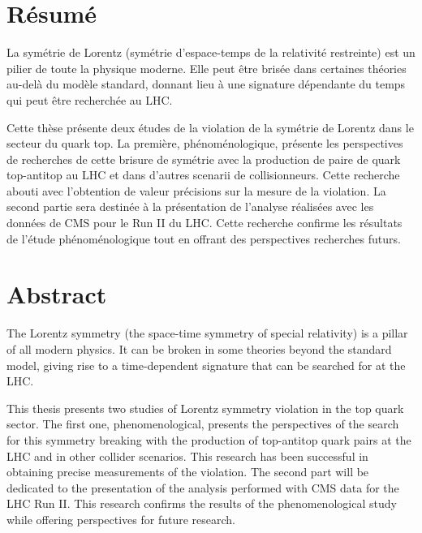 \begingroup
\let\clearpage\relax
\let\cleardoublepage\relax
\let\cleardoublepage\relax

\chapter*{Résumé}

La symétrie de Lorentz (symétrie d'espace-temps de la relativité restreinte) est un pilier de toute la physique moderne. Elle peut être brisée dans certaines théories au-delà du modèle standard, donnant lieu à une signature dépendante du temps qui peut être recherchée au LHC.

Cette thèse présente deux études de la violation de la symétrie de Lorentz dans le secteur du quark top. La première, phénoménologique, présente les perspectives de recherches de cette brisure de symétrie avec la production de paire de quark top-antitop au LHC et dans d'autres scenarii de collisionneurs. Cette recherche abouti avec l'obtention de valeur précisions sur la mesure de la violation. La second partie sera destinée à la présentation de l'analyse réalisées avec les données de CMS pour le Run II du LHC. Cette recherche confirme les résultats de l'étude phénoménologique tout en offrant des perspectives recherches futurs. 



\vfill

\chapter*{Abstract}

The Lorentz symmetry (the space-time symmetry of special relativity) is a pillar of all modern physics. It can be broken in some theories beyond the standard model, giving rise to a time-dependent signature that can be searched for at the LHC.

This thesis presents two studies of Lorentz symmetry violation in the top quark sector. The first one, phenomenological, presents the perspectives of the search for this symmetry breaking with the production of top-antitop quark pairs at the LHC and in other collider scenarios. This research has been successful in obtaining precise measurements of the violation. The second part will be dedicated to the presentation of the analysis performed with CMS data for the LHC Run II. This research confirms the results of the phenomenological study while offering perspectives for future research. 


\endgroup			

\vfill
